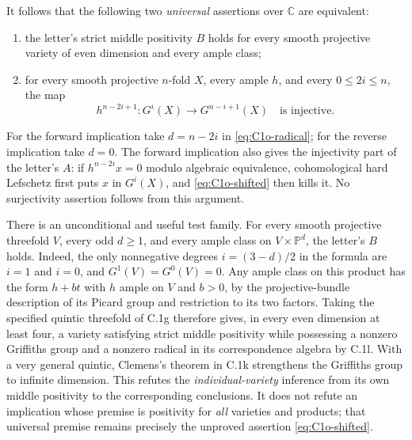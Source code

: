 It follows that the following two \emph{universal} assertions over
$\mathbb C$ are equivalent:
\begin{enumerate}
\item the letter's strict middle positivity $B$ holds for every smooth
projective variety of even dimension and every ample class;
\item for every smooth projective $n$-fold $X$, every ample $h$, and
every $0\le 2i\le n$, the map
\begin{equation}\label{eq:C1o-shifted}
 h^{n-2i+1}:G^i(X)\longrightarrow G^{n-i+1}(X)
 \quad\text{is injective}.
\end{equation}
\end{enumerate}
For the forward implication take $d=n-2i$ in
\eqref{eq:C1o-radical}; for the reverse implication take $d=0$.
The forward implication also gives the injectivity part of the
letter's $A$: if $h^{n-2i}x=0$ modulo algebraic equivalence,
cohomological hard Lefschetz first puts $x$ in $G^i(X)$, and
\eqref{eq:C1o-shifted} then kills it. No surjectivity assertion follows
from this argument.

There is an unconditional and useful test family. For every smooth
projective threefold $V$, every odd $d\ge1$, and every ample class on
$V\times\mathbb P^d$, the letter's $B$ holds. Indeed, the only
nonnegative degrees $i=(3-d)/2$ in the formula are $i=1$ and $i=0$,
and $G^1(V)=G^0(V)=0$. Any ample class on this product has the form
$h+bt$ with $h$ ample on $V$ and $b>0$, by the projective-bundle
description of its Picard group and restriction to its two factors.
Taking the specified quintic threefold of C.1g therefore gives, in
every even dimension at least four, a variety satisfying strict
middle positivity while possessing a nonzero Griffiths group and
a nonzero radical in its correspondence algebra by C.1l.
With a very general quintic, Clemens's theorem in C.1k strengthens
the Griffiths group to infinite dimension. This refutes the
\emph{individual-variety} inference from its own middle positivity
to the corresponding conclusions. It does not refute
an implication whose premise is positivity for \emph{all} varieties
and products; that universal premise remains precisely the
unproved assertion \eqref{eq:C1o-shifted}.

